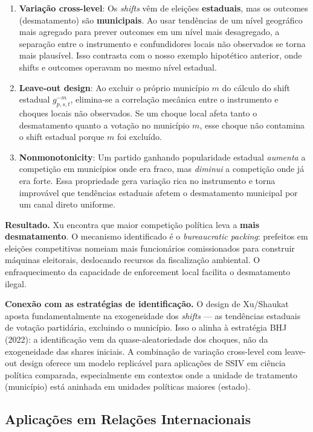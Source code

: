 \documentclass[
]{article}
\begin{document}
\begin{enumerate}
\def\labelenumi{\arabic{enumi}.}
\item
  \textbf{Variação cross-level}: Os \emph{shifts} vêm de eleições \textbf{estaduais}, mas os outcomes (desmatamento) são \textbf{municipais}. Ao usar tendências de um nível geográfico mais agregado para prever outcomes em um nível mais desagregado, a separação entre o instrumento e confundidores locais não observados se torna mais plausível. Isso contrasta com o nosso exemplo hipotético anterior, onde shifts e outcomes operavam no mesmo nível estadual.
\item
  \textbf{Leave-out design}: Ao excluir o próprio município \(m\) do cálculo do shift estadual \(g_{p,s,t}^{-m}\), elimina-se a correlação mecânica entre o instrumento e choques locais não observados. Se um choque local afeta tanto o desmatamento quanto a votação no município \(m\), esse choque não contamina o shift estadual porque \(m\) foi excluído.
\item
  \textbf{Nonmonotonicity}: Um partido ganhando popularidade estadual \emph{aumenta} a competição em municípios onde era fraco, mas \emph{diminui} a competição onde já era forte. Essa propriedade gera variação rica no instrumento e torna improvável que tendências estaduais afetem o desmatamento municipal por um canal direto uniforme.
\end{enumerate}

\textbf{Resultado.} Xu encontra que maior competição política leva a \textbf{mais desmatamento}. O mecanismo identificado é o \emph{bureaucratic packing}: prefeitos em eleições competitivas nomeiam mais funcionários comissionados para construir máquinas eleitorais, deslocando recursos da fiscalização ambiental. O enfraquecimento da capacidade de enforcement local facilita o desmatamento ilegal.

\textbf{Conexão com as estratégias de identificação.} O design de Xu/Shaukat aposta fundamentalmente na exogeneidade dos \emph{shifts} --- as tendências estaduais de votação partidária, excluindo o município. Isso o alinha à estratégia BHJ (2022): a identificação vem da quase-aleatoriedade dos choques, não da exogeneidade das shares iniciais. A combinação de variação cross-level com leave-out design oferece um modelo replicável para aplicações de SSIV em ciência política comparada, especialmente em contextos onde a unidade de tratamento (município) está aninhada em unidades políticas maiores (estado).

\subsection{Aplicações em Relações Internacionais}\label{aplicauxe7uxf5es-em-relauxe7uxf5es-internacionais}
\end{document}
